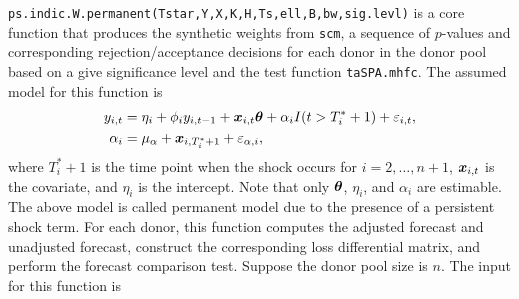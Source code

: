 \documentclass[12pt]{article}
\begin{document}
 \texttt{ps.indic.W.permanent(Tstar,Y,X,K,H,Ts,ell,B,bw,sig.levl)} is a core function that produces the synthetic weights from \texttt{scm}, a sequence of $p$-values and corresponding rejection/acceptance decisions for each donor in the donor pool based on a give significance level and the test  function \texttt{taSPA.mhfc}. The assumed model for this function is
 \begin{align*}
 	y_{i,t} &= \eta_i + \phi_i y_{i, t-1}  + \boldsymbol{x}_{i, t}\boldsymbol{\theta} + \alpha_i I(t > T_i^*+1) + \varepsilon_{i,t},\\
 	\alpha_i & = \mu_{\alpha} + \boldsymbol{x}_{i, T_i^*+1} + \varepsilon_{\alpha, i},
 \end{align*}
 where $T_i^*+1$ is the time point when the shock occurs for $i = 2, \ldots, n+1$, $\boldsymbol{x}_{i,t}$ is the covariate, and $\eta_i$ is the intercept. Note that only $\boldsymbol{\theta}$, $\eta_i$, and $\alpha_i$ are estimable. The above model is called permanent model due to the presence of a persistent shock term. For each donor, this function computes the adjusted forecast and unadjusted forecast, construct the corresponding loss differential matrix, and perform the forecast comparison test.  Suppose the donor pool size is $n$. The input for this function is
\end{document}
